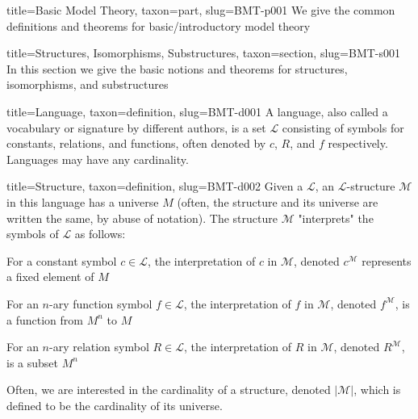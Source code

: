 \documentclass[a4paper]{article}
\begin{document}
  
\begin{tree}{title={Basic Model Theory}, taxon={part}, slug={BMT-p001}}
We give the common definitions and theorems for basic/introductory model theory
  
  
\begin{tree}{title={Structures, Isomorphisms, Substructures}, taxon={section}, slug={BMT-s001}}
In this section we give the basic notions and theorems for structures, isomorphisms, and substructures
\begin{tree}{title={Language}, taxon={definition}, slug={BMT-d001}}
A language, also called a vocabulary or signature by different authors, is a set \(\mathcal {L}\) consisting of symbols for constants, relations, and functions, 
often denoted by \(c\), \(R\), and \(f\) respectively. Languages may have any cardinality.
\end{tree}

\begin{tree}{title={Structure}, taxon={definition}, slug={BMT-d002}}
Given a  \(\mathcal {L}\), an \(\mathcal {L}\)-structure \(\mathcal {M}\) in this language has a universe \(M\) (often, the structure and its universe 
are written the same, by abuse of notation). The structure \(\mathcal {M}\) "interprets" the symbols of \(\mathcal {L}\) as follows:\par{For a constant symbol \(c \in   \mathcal {L}\), the interpretation of \(c\) in \(\mathcal {M}\), denoted \(c^{ \mathcal {M}}\) represents a fixed 
element of \(M\)}\par{For an \(n\)-ary function symbol \(f \in   \mathcal {L}\), the interpretation of \(f\) in \(\mathcal {M}\), denoted \(f^{ \mathcal {M}}\),
is a function from \(M^n\) to \(M\)}\par{For an \(n\)-ary relation symbol \(R \in   \mathcal {L}\), the interpretation of \(R\) in \(\mathcal {M}\), denoted \(R^{ \mathcal {M}}\),
is a subset \(M^n\)}\par{Often, we are interested in the cardinality of a structure, denoted \(| \mathcal {M}|\), which is defined to be the cardinality of its universe.}
\end{tree}


\end{tree}
\end{tree}
\end{document}
